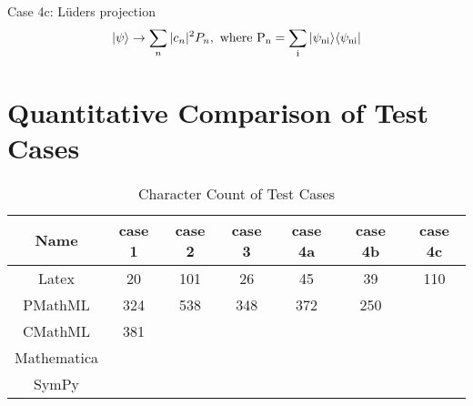 \documentclass{article}
\begin{document}
\begin{multicols}{2}
Case 4c: L\"{u}ders projection
\begin{equation}
 |\psi\rangle \rightarrow \sum_n  |c_n|^2 P_n,\ \rm{where}\ P_n = \sum_i |\psi_{ni}\rangle \langle \psi_{ni}|
\label{eq:Luders_projection_case4c_body}
\end{equation}

\section{Quantitative Comparison of Test Cases\label{sec:quant_compare}}

\end{multicols}
\begin{center}
\begin{table}
\caption {Character Count of Test Cases} \label{table:char_count} 
\begin{center}
\begin{tabular}{|c|c|c|c|c|c|c|}\hline
Name            & case 1 & case 2 & case 3 & case 4a & case 4b & case 4c \\\hline
Latex            & 20       & 101     & 26       & 45         &   39      & 110 \\\hline
PMathML      &  324     & 538    & 348     & 372       &  250      &        \\\hline
CMathML      &   381    &           &            &             &              &        \\\hline
Mathematica &             &           &            &             &              &        \\\hline
SymPy           &             &           &            &             &              &        \\\hline
\end{tabular}
\end{center}
\end{table}
\end{center}
\end{document}
